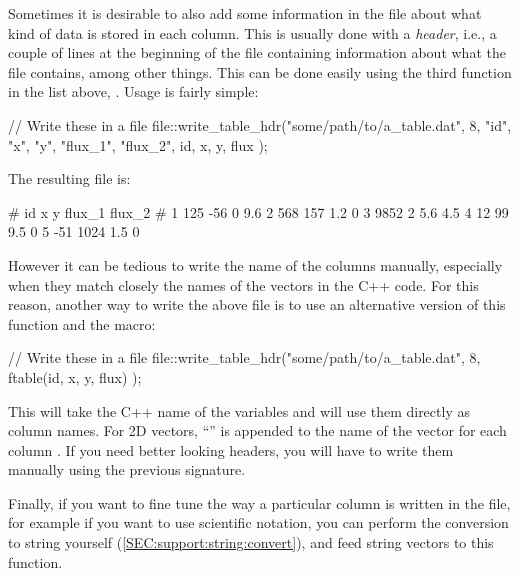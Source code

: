 Sometimes it is desirable to also add some information in the file about what kind of data is stored in each column. This is usually done with a \emph{header}, i.e., a couple of lines at the beginning of the file containing information about what the file contains, among other things. This can be done easily using the third function in the list above, . Usage is fairly simple:
\begin{cppcode}
// Write these in a file
file::write_table_hdr("some/path/to/a_table.dat", 8,
    {"id", "x", "y", "flux_1", "flux_2"},
    id, x, y, flux
);
\end{cppcode}

The resulting file is:
\begin{bashcode}
#     id       x       y  flux_1  flux_2
#
       1     125     -56       0     9.6
       2     568     157     1.2       0
       3    9852       2     5.6     4.5
       4      12      99     9.5       0
       5     -51    1024     1.5       0
\end{bashcode}

However it can be tedious to write the name of the columns manually, especially when they match closely the names of the vectors in the C++ code. For this reason, another way to write the above file is to use an alternative version of this function and the  macro:
\begin{cppcode}
// Write these in a file
file::write_table_hdr("some/path/to/a_table.dat", 8,
    ftable(id, x, y, flux)
);
\end{cppcode}

This will take the C++ name of the variables and will use them directly as column names. For 2D vectors, ``'' is appended to the name of the vector for each column . If you need better looking headers, you will have to write them manually using the previous signature.

Finally, if you want to fine tune the way a particular column is written in the file, for example if you want to use scientific notation, you can perform the conversion to string yourself (\ref{SEC:support:string:convert}), and feed string vectors to this function.
